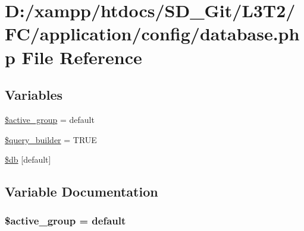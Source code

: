 \hypertarget{application_2config_2database_8php}{}\section{D\+:/xampp/htdocs/\+S\+D\+\_\+\+Git/\+L3\+T2/\+F\+C/application/config/database.php File Reference}
\label{application_2config_2database_8php}
\subsection*{Variables}
\begin{DoxyCompactItemize}
\item 
\hyperlink{application_2config_2database_8php_a5046ea83a698c5b7bbf6ffd3dd816b65}{\$active\+\_\+group} = \textquotesingle{}default\textquotesingle{}
\item 
\hyperlink{application_2config_2database_8php_a11d000bc34a3940bb236487b672328bf}{\$query\+\_\+builder} = T\+R\+U\+E
\item 
\hyperlink{application_2config_2database_8php_ad0fb5aa377966ebea235874ccab61f40}{\$db} \mbox{[}\textquotesingle{}default\textquotesingle{}\mbox{]}
\end{DoxyCompactItemize}


\subsection{Variable Documentation}
\hypertarget{application_2config_2database_8php_a5046ea83a698c5b7bbf6ffd3dd816b65}{}
\subsubsection[{\$active\+\_\+group}]{\setlength{\rightskip}{0pt plus 5cm}\$active\+\_\+group = \textquotesingle{}default\textquotesingle{}}\label{application_2config_2database_8php_a5046ea83a698c5b7bbf6ffd3dd816b65}
\hypertarget{application_2config_2database_8php_ad0fb5aa377966ebea235874ccab61f40}{}

